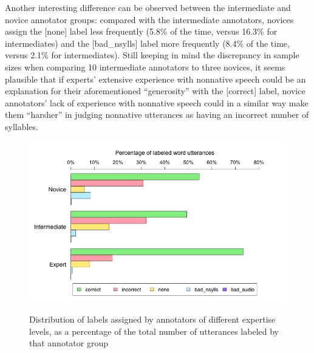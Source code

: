 			Another interesting difference can be observed between the intermediate and novice annotator groups: compared with the intermediate annotators, novices assign the [none] label less frequently (5.8\% of the time, versus 16.3\% for intermediates) and the [bad\_nsylls] label more frequently (8.4\% of the time, versus 2.1\% for intermediates). Still keeping in mind the discrepancy in sample sizes when comparing 10 intermediate annotators to three novices, 
			it seems plausible that if experts' extensive experience with nonnative speech could be an explanation for their aforementioned ``generosity'' with the [correct] label, novice annotators' lack of experience with nonnative speech could in a similar way make them ``harsher'' in judging nonnative utterances as having an incorrect number of syllables. 
			
			\begin{figure}[tb]
				\centering
				\caption[Distribution of labels by annotator expertise]{Distribution of labels assigned by annotators of different expertise levels,
				as a percentage of the total number of utterances labeled by that annotator group
				}
				\includegraphics[width=\textwidth]{img/plots/pctJudgmentsByExpertise-notStacked}
				\label{fig:agreement:expertisebars}
			\end{figure}			
			
			
			
